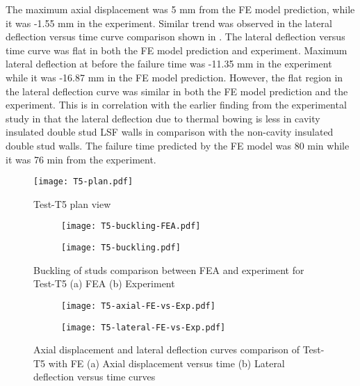 The maximum axial displacement was 5 mm from the FE model prediction, while it was -1.55 mm in the experiment. Similar trend was observed in the lateral deflection versus time curve comparison shown in . The lateral deflection versus time curve was flat in both the FE model prediction and experiment. Maximum lateral deflection at before the failure time was -11.35 mm in the experiment while it was -16.87 mm in the FE model prediction. However, the flat region in the lateral deflection curve was similar in both the FE model prediction and the experiment. This is in correlation with the earlier finding from the experimental study in  that the lateral deflection due to thermal bowing is less in cavity insulated double stud LSF walls in comparison with the non-cavity insulated double stud walls. The failure time predicted by the FE model was 80 min while it was 76 min from the experiment.  
\begin{figure}[!htbp]
	\centering
			\texttt{[image: T5-plan.pdf]}\\
		\caption{Test-T5 plan view}
		\label{fig:T5-plan-FEA}
\end{figure}
\begin{figure}[!htbp]
	\centering
	\begin{subfigure}[b]{0.8\textwidth}
		\centering
		\texttt{[image: T5-buckling-FEA.pdf]}
		\caption{}
		\label{subfig:T5-buckling-FEA}
	\end{subfigure}
	\begin{subfigure}[b]{0.3\textwidth}
		\centering
		\texttt{[image: T5-buckling.pdf]}
		\caption{}
		\label{subfig:T5-buckling-FEA-Exp}
	\end{subfigure}
	   \caption{Buckling of studs comparison between FEA and experiment for Test-T5 (a) FEA (b) Experiment}
	   \label{fig:T5-buckling-FE-vs-Exp}
\end{figure} 
\begin{figure}[!htbp]
	\centering
	\begin{subfigure}[b]{0.45\textwidth}
		\centering
		\texttt{[image: T5-axial-FE-vs-Exp.pdf]}
		\caption{}
		\label{subfig:T5-axial-FE-vs-Exp}
	\end{subfigure}
	\begin{subfigure}[b]{0.45\textwidth}
		\centering
		\texttt{[image: T5-lateral-FE-vs-Exp.pdf]}
		\caption{}
		\label{subfig:T5-lateral-FE-vs-Exp}
	\end{subfigure}
	   \caption{Axial displacement and lateral deflection curves comparison of Test-T5 with FE (a) Axial displacement versus time (b) Lateral deflection versus time curves}
	   \label{fig:T5-structural-FE-vs-Exp}
\end{figure} 

